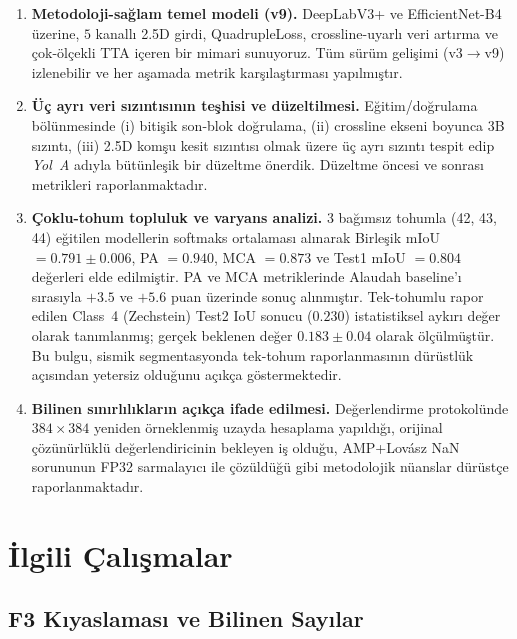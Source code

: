\documentclass[conference,a4paper,10pt]{IEEEtran}
\begin{document}
\begin{enumerate}
\item \textbf{Metodoloji-sağlam temel modeli (v9).} DeepLabV3+ ve EfficientNet-B4 üzerine,
$5$ kanallı 2.5D girdi, QuadrupleLoss, crossline-uyarlı veri artırma ve çok-ölçekli
TTA içeren bir mimari sunuyoruz. Tüm sürüm gelişimi (v3$\rightarrow$v9) izlenebilir ve
her aşamada metrik karşılaştırması yapılmıştır.

\item \textbf{Üç ayrı veri sızıntısının teşhisi ve düzeltilmesi.} Eğitim/doğrulama
bölünmesinde (i) bitişik son-blok doğrulama, (ii) crossline ekseni boyunca 3B sızıntı,
(iii) 2.5D komşu kesit sızıntısı olmak üzere üç ayrı sızıntı tespit edip
\emph{Yol~A} adıyla bütünleşik bir düzeltme önerdik. Düzeltme öncesi ve sonrası
metrikleri raporlanmaktadır.

\item \textbf{Çoklu-tohum topluluk ve varyans analizi.} 3 bağımsız tohumla (42, 43, 44)
eğitilen modellerin softmaks ortalaması alınarak Birleşik mIoU $= 0.791 \pm 0.006$,
PA $= 0.940$, MCA $= 0.873$ ve Test1 mIoU $= 0.804$ değerleri elde edilmiştir.
PA ve MCA metriklerinde Alaudah baseline'ı sırasıyla $+3.5$ ve $+5.6$ puan
üzerinde sonuç alınmıştır. Tek-tohumlu rapor edilen Class~4 (Zechstein) Test2
IoU sonucu ($0.230$) istatistiksel aykırı değer olarak tanımlanmış; gerçek
beklenen değer $0.183 \pm 0.04$ olarak ölçülmüştür. Bu bulgu, sismik
segmentasyonda tek-tohum raporlanmasının dürüstlük açısından yetersiz
olduğunu açıkça göstermektedir.

\item \textbf{Bilinen sınırlılıkların açıkça ifade edilmesi.} Değerlendirme protokolünde
$384\times 384$ yeniden örneklenmiş uzayda hesaplama yapıldığı, orijinal çözünürlüklü
değerlendiricinin bekleyen iş olduğu, AMP+Lovász NaN sorununun FP32 sarmalayıcı ile
çözüldüğü gibi metodolojik nüanslar dürüstçe raporlanmaktadır.
\end{enumerate}

\section{İlgili Çalışmalar}
\label{sec:ilgili}

\subsection{F3 Kıyaslaması ve Bilinen Sayılar}
\end{document}
